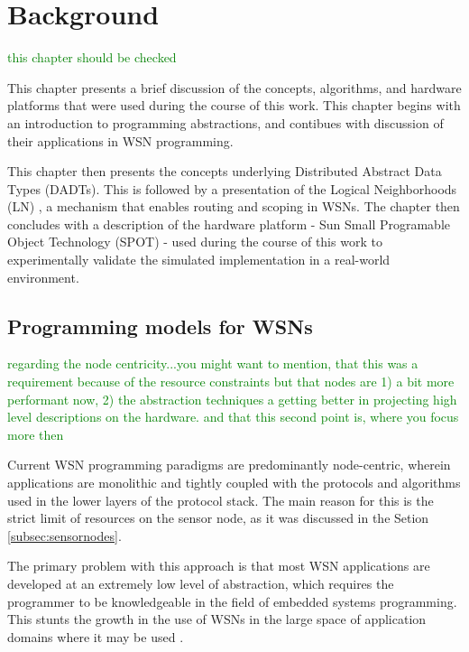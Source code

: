 \chapter{Background}


\textcolor{green}{this chapter should be checked}

This chapter presents a brief discussion of the concepts, algorithms, and 
hardware platforms that were used during the course of this work. This
chapter begins with an introduction to programming abstractions, and contibues
with discussion of their applications in WSN programming.

This chapter then presents the concepts underlying
Distributed Abstract Data Types (DADTs). This is followed by a presentation of
the Logical Neighborhoods (LN) \cite{mottola_LNScoping:2006}, a mechanism that
enables routing and scoping in WSNs. The chapter then concludes 
with a description of the hardware platform - Sun Small Programable Object
Technology (SPOT) \cite{simon_squawk:2006} - used during the course of this work
to experimentally validate the simulated implementation in a
real-world environment. 

\section {Programming models for WSNs}

\textcolor{green}{regarding the node centricity...you might want to mention, that this was a requirement because of the resource constraints  but that nodes  are 1) a bit more performant now, 2) the abstraction techniques a getting better in projecting high level descriptions on the hardware. and that this second point is, where you focus more then }

Current WSN programming paradigms are predominantly node-centric, wherein
applications are monolithic and tightly coupled with the protocols and algorithms
used in the lower layers of the protocol stack. 
The main reason for this is the strict limit of resources on the sensor node, as
it was discussed in the Setion \ref{subsec:sensornodes}.

The primary problem with this approach is that most WSN applications are developed at an extremely low level of abstraction, 
which requires the programmer to be knowledgeable in the field of
embedded systems programming. This stunts the growth in the use of WSNs in the
large space of application domains where it may be used
\cite{mottola_middleware:2008}. 


